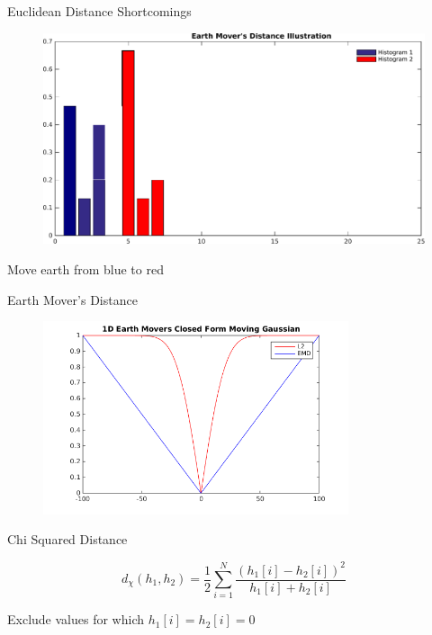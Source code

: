 \documentclass{beamer}
\begin{document}
\begin{frame}{Euclidean Distance Shortcomings}

\begin{figure}[t]
	\centering
    \includegraphics[width=\textwidth]{EMDVisual.pdf}
\end{figure}

Move earth from blue to red

\end{frame}

\begin{frame}{Earth Mover's Distance}

\begin{figure}[t]
	\centering
    \includegraphics[width=0.8\textwidth]{1DEMDExample.png}
\end{figure}

\end{frame}

\begin{frame}{Chi Squared Distance}

\[ d_{\chi}(h_1, h_2) = \frac{1}{2} \sum_{i=1}^N \frac{(h_1[i] - h_2[i])^2}{h_1[i]+h_2[i]}\]

Exclude values for which $h_1[i] = h_2[i] = 0$

\end{frame}
\end{document}
